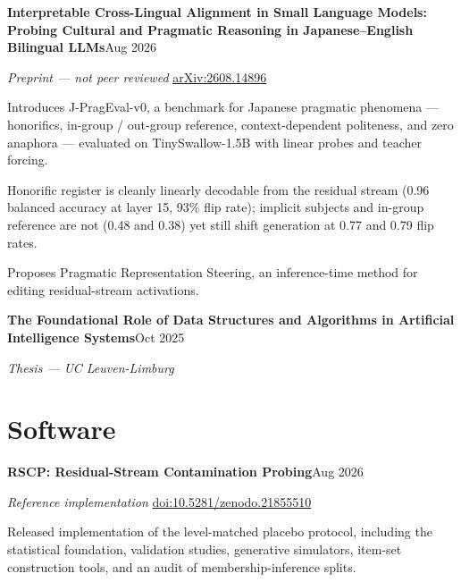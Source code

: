 \vspace{4pt}
{\bodysize\textbf{Interpretable Cross-Lingual Alignment in Small Language Models: Probing Cultural and Pragmatic Reasoning in Japanese--English Bilingual LLMs}\hfill{\smallsize\color{subtle}Aug 2026}}\par
\vspace{1pt}
{\bodysize\color{subtle}\textit{Preprint --- not peer reviewed} \quad\href{https://arxiv.org/abs/2608.14896}{\smallsize arXiv:2608.14896}}\par
\vspace{2pt}
\begin{bullets}
    \item Introduces J-PragEval-v0, a benchmark for Japanese pragmatic phenomena --- honorifics, in-group / out-group reference, context-dependent politeness, and zero anaphora --- evaluated on TinySwallow-1.5B with linear probes and teacher forcing.
    \item Honorific register is cleanly linearly decodable from the residual stream (0.96 balanced accuracy at layer 15, 93\% flip rate); implicit subjects and in-group reference are not (0.48 and 0.38) yet still shift generation at 0.77 and 0.79 flip rates.
    \item Proposes Pragmatic Representation Steering, an inference-time method for editing residual-stream activations.
\end{bullets}

\vspace{4pt}
{\bodysize\textbf{The Foundational Role of Data Structures and Algorithms in Artificial Intelligence Systems}\hfill{\smallsize\color{subtle}Oct 2025}}\par
\vspace{1pt}
{\bodysize\color{subtle}\textit{Thesis --- UC Leuven-Limburg}}  %

\section{Software}

{\bodysize\textbf{RSCP: Residual-Stream Contamination Probing}\hfill{\smallsize\color{subtle}Aug 2026}}\par
\vspace{1pt}
{\bodysize\color{subtle}\textit{Reference implementation} \quad\href{https://doi.org/10.5281/zenodo.21855510}{\smallsize doi:10.5281/zenodo.21855510}}\par
\vspace{2pt}
\begin{bullets}
    \item Released implementation of the level-matched placebo protocol, including the statistical foundation, validation studies, generative simulators, item-set construction tools, and an audit of membership-inference splits.
\end{bullets}

